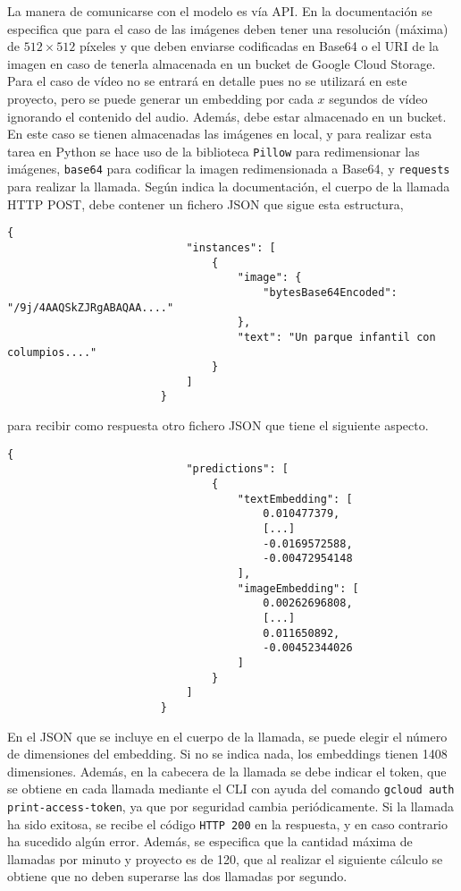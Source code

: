 				La manera de comunicarse con el modelo es vía API. En la documentación se especifica que para el caso de las imágenes deben tener una resolución (máxima) de $512 \times 512$ píxeles y que deben enviarse codificadas en Base64 o el URI de la imagen en caso de tenerla almacenada en un bucket de Google Cloud Storage. Para el caso de vídeo no se entrará en detalle pues no se utilizará en este proyecto, pero se puede generar un embedding por cada $x$ segundos de vídeo ignorando el contenido del audio. Además, debe estar almacenado en un bucket. En este caso se tienen almacenadas las imágenes en local, y para realizar esta tarea en Python se hace uso de la biblioteca \texttt{Pillow} para redimensionar las imágenes, \texttt{base64} para codificar la imagen redimensionada a Base64, y \texttt{requests} para realizar la llamada. Según indica la documentación, el cuerpo de la llamada HTTP POST, debe contener un fichero JSON que sigue esta estructura,
				\begin{center}
					\begin{BVerbatim}[tabsize = 3]
						{
							"instances": [
								{
									"image": {
										"bytesBase64Encoded": "/9j/4AAQSkZJRgABAQAA...."
									}, 
									"text": "Un parque infantil con columpios...."
								}
							]
						}
					\end{BVerbatim}
				\end{center}
				para recibir como respuesta otro fichero JSON que tiene el siguiente aspecto. 
				\begin{center}
					\begin{BVerbatim}[tabsize = 3]
						{
							"predictions": [
								{
									"textEmbedding": [
										0.010477379,
										[...]
										-0.0169572588,
										-0.00472954148
									],
									"imageEmbedding": [
										0.00262696808,
										[...]
										0.011650892,
										-0.00452344026
									]
								}
							]
						}
					\end{BVerbatim}
				\end{center}
				
				En el JSON que se incluye en el cuerpo de la llamada, se puede elegir el número de dimensiones del embedding. Si no se indica nada, los embeddings tienen 1408 dimensiones. Además, en la cabecera de la llamada se debe indicar el token, que se obtiene en cada llamada mediante el CLI con ayuda del comando \texttt{gcloud auth print-access-token}, ya que por seguridad cambia periódicamente. Si la llamada ha sido exitosa, se recibe el código \texttt{HTTP 200} en la respuesta, y en caso contrario ha sucedido algún error. Además, se especifica que la cantidad máxima de llamadas por minuto y proyecto es de 120, que al realizar el siguiente cálculo se obtiene que no deben superarse las dos llamadas por segundo. 
				
